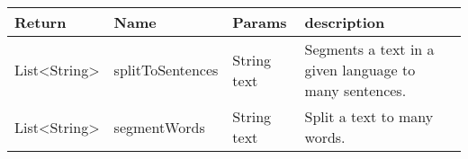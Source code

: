 \begin{tabular}{p{}p{}p{}p{}} 
	\hline \hline
	
	Return & Name & Params & description \\
	
	\hline\hline

	List<String> & splitToSentences & String text & 
	Segments a text in a given language to many sentences. \\
	
	\hline
	
	List<String> & segmentWords & String text &
	Split a text to many words.  \\
	
	\hline \hline
\end{tabular}